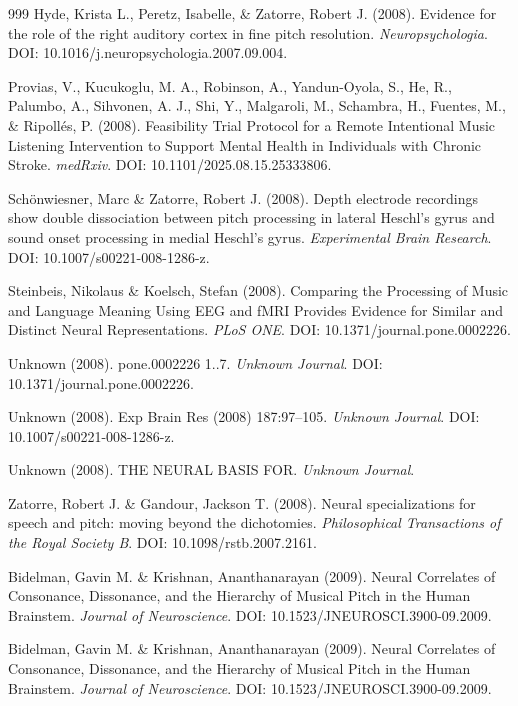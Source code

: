 \documentclass[9pt,onecolumn]{article}
\begin{document}
\begin{thebibliography}{999}
Hyde, Krista L., Peretz, Isabelle, \& Zatorre, Robert J. (2008). Evidence for the role of the right auditory cortex in fine pitch resolution. \textit{Neuropsychologia}. DOI: 10.1016/j.neuropsychologia.2007.09.004.

Provias, V., Kucukoglu, M. A., Robinson, A., Yandun-Oyola, S., He, R., Palumbo, A., Sihvonen, A. J., Shi, Y., Malgaroli, M., Schambra, H., Fuentes, M., \& Ripollés, P. (2008). Feasibility Trial Protocol for a Remote Intentional Music Listening Intervention to Support Mental Health in Individuals with Chronic Stroke. \textit{medRxiv}. DOI: 10.1101/2025.08.15.25333806.

Schönwiesner, Marc \& Zatorre, Robert J. (2008). Depth electrode recordings show double dissociation between pitch processing in lateral Heschl's gyrus and sound onset processing in medial Heschl's gyrus. \textit{Experimental Brain Research}. DOI: 10.1007/s00221-008-1286-z.

Steinbeis, Nikolaus \& Koelsch, Stefan (2008). Comparing the Processing of Music and Language Meaning Using EEG and fMRI Provides Evidence for Similar and Distinct Neural Representations. \textit{PLoS ONE}. DOI: 10.1371/journal.pone.0002226.

Unknown (2008). pone.0002226 1..7. \textit{Unknown Journal}. DOI: 10.1371/journal.pone.0002226.

Unknown (2008). Exp Brain Res (2008) 187:97–105. \textit{Unknown Journal}. DOI: 10.1007/s00221-008-1286-z.

Unknown (2008). THE NEURAL BASIS FOR. \textit{Unknown Journal}.

Zatorre, Robert J. \& Gandour, Jackson T. (2008). Neural specializations for speech and pitch: moving beyond the dichotomies. \textit{Philosophical Transactions of the Royal Society B}. DOI: 10.1098/rstb.2007.2161.

Bidelman, Gavin M. \& Krishnan, Ananthanarayan (2009). Neural Correlates of Consonance, Dissonance, and the Hierarchy of Musical Pitch in the Human Brainstem. \textit{Journal of Neuroscience}. DOI: 10.1523/JNEUROSCI.3900-09.2009.

Bidelman, Gavin M. \& Krishnan, Ananthanarayan (2009). Neural Correlates of Consonance, Dissonance, and the Hierarchy of Musical Pitch in the Human Brainstem. \textit{Journal of Neuroscience}. DOI: 10.1523/JNEUROSCI.3900-09.2009.


\end{thebibliography}
\end{document}
